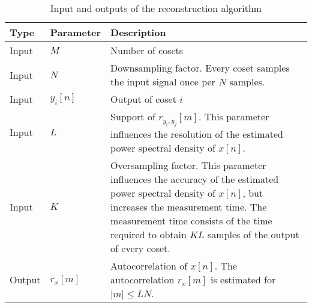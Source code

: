 \documentclass[a4paper, openany, oneside]{memoir}
\begin{document}
\begin{table}
    \centering
    \begin{tabularx}{\textwidth}{llY}
        \textbf{Type} & \textbf{Parameter} & \textbf{Description} \\ \hline
        Input & $M$ & Number of cosets \\
        Input & $N$ & Downsampling factor. Every coset samples the input signal once per $N$ samples. \\
        Input & $y_i[n]$ & Output of coset $i$ \\
        Input & $L$ & Support of $r_{y_i,y_j}[m]$. This parameter influences the resolution of the estimated power spectral density of $x[n]$. \\
        Input & $K$ & Oversampling factor. This parameter influences the accuracy of the estimated power spectral density of $x[n]$, but increases the measurement time. The measurement time consists of the time required to obtain $KL$ samples of the output of every coset. \\
        Output & $r_x[m]$ & Autocorrelation of $x[n]$. The autocorrelation $r_x[m]$ is estimated for $|m| \le LN$.
    \end{tabularx}
    \caption{Input and outputs of the reconstruction algorithm}
    \label{tab:reconstruction-algorithm-inputs-outputs}
\end{table}
\end{document}
